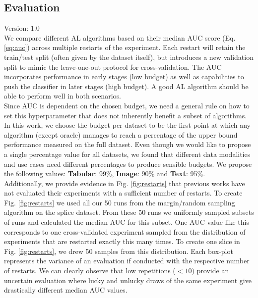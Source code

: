 \documentclass[]{article}
\begin{document}
\subsection{Evaluation}\label{sec:evaluation}
{\color{red} Version: 1.0}\\
We compare different AL algorithms based on their median AUC score (Eq. \ref{eq:auc}) across multiple restarts of the experiment.
Each restart will retain the train/test split (often given by the dataset itself), but introduces a new validation split to mimic the leave-one-out protocol for cross-validation.
The AUC incorporates performance in early stages (low budget) as well as capabilities to push the classifier in later stages (high budget).
A good AL algorithm should be able to perform well in both scenarios. \\ [1mm]
Since AUC is dependent on the chosen budget, we need a general rule on how to set this hyperparameter that does not inherently benefit a subset of algorithms.
In this work, we choose the budget per dataset to be the first point at which any algorithm (except oracle) manages to reach a percentage of the upper bound performance measured on the full dataset.
Even though we would like to propose a single percentage value for all datasets, we found that different data modalities and use cases need different percentages to produce sensible budgets.
We propose the following values: \textbf{Tabular}: 99\%, \textbf{Image}: 90\% and \textbf{Text}: 95\%. \\ [1mm]
Additionally, we provide evidence in Fig. \ref{fig:restarts} that previous works have not evaluated their experiments with a sufficient number of restarts.
To create Fig. \ref{fig:restarts} we used all our 50 runs from the margin/random sampling algorithm on the splice dataset.
From these 50 runs we uniformly sampled subsets of runs and calculated the median AUC for this subset.
One AUC value like this corresponds to one cross-validated experiment sampled from the distribution of experiments that are restarted exactly this many times.
To create one slice in Fig. \ref{fig:restarts}, we drew 50 samples from this distribution.
Each box-plot represents the variance of an evaluation if conducted with the respective number of restarts.
We can clearly observe that low repetitions ($<10$) provide an uncertain evaluation where lucky and unlucky draws of the same experiment give drastically different median AUC values.
\end{document}
